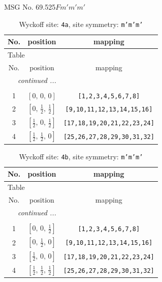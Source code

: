 \documentclass[fleqn,8pt]{jsarticle}
\begin{document}
\setcounter{MaxMatrixCols}{32}

\renewcommand{\tablename}{Table~}
\renewcommand{\figurename}{Figure~}
\begin{center}
\LARGE
MSG No. 69.525\quad$Fm'm'm'$
\end{center}
\renewcommand{\arraystretch}{1.2}
\begin{longtable}{ccc}
\caption{Wyckoff site: {\tt 4a}, site symmetry: {\tt m'm'm'}}
 \\
 \hline \hline
No. & position & mapping \\ \hline \endfirsthead

\multicolumn{2}{l}{\tablename\ \thetable{}} \\
 \hline \hline
No. & position & mapping \\ \hline \endhead

 \hline \hline
\multicolumn{2}{r}{\footnotesize\it continued ...} \\ \endfoot

 \hline \hline
\multicolumn{2}{r}{} \\ \endlastfoot

1 & $\left[ 0,\, 0,\, 0 \right]$ & {\tt [1,2,3,4,5,6,7,8]} \\ \hline
2 & $\left[ 0,\, \frac{1}{2},\, \frac{1}{2} \right]$ & {\tt [9,10,11,12,13,14,15,16]} \\ \hline
3 & $\left[ \frac{1}{2},\, 0,\, \frac{1}{2} \right]$ & {\tt [17,18,19,20,21,22,23,24]} \\ \hline
4 & $\left[ \frac{1}{2},\, \frac{1}{2},\, 0 \right]$ & {\tt [25,26,27,28,29,30,31,32]} \\
\end{longtable}
\renewcommand{\arraystretch}{1.2}
\begin{longtable}{ccc}
\caption{Wyckoff site: {\tt 4b}, site symmetry: {\tt m'm'm'}}
 \\
 \hline \hline
No. & position & mapping \\ \hline \endfirsthead

\multicolumn{2}{l}{\tablename\ \thetable{}} \\
 \hline \hline
No. & position & mapping \\ \hline \endhead

 \hline \hline
\multicolumn{2}{r}{\footnotesize\it continued ...} \\ \endfoot

 \hline \hline
\multicolumn{2}{r}{} \\ \endlastfoot

1 & $\left[ 0,\, 0,\, \frac{1}{2} \right]$ & {\tt [1,2,3,4,5,6,7,8]} \\ \hline
2 & $\left[ 0,\, \frac{1}{2},\, 0 \right]$ & {\tt [9,10,11,12,13,14,15,16]} \\ \hline
3 & $\left[ \frac{1}{2},\, 0,\, 0 \right]$ & {\tt [17,18,19,20,21,22,23,24]} \\ \hline
4 & $\left[ \frac{1}{2},\, \frac{1}{2},\, \frac{1}{2} \right]$ & {\tt [25,26,27,28,29,30,31,32]} \\
\end{longtable}
\end{document}
